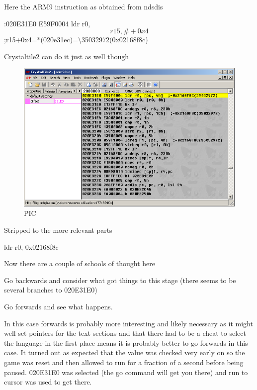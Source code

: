 \documentclass[
]{book}
\begin{document}
Here the ARM9 instruction as obtained from ndsdis

:020E31E0 E59F0004 ldr r0,\[r15, \#+0x4\] ;r15+0x4=*(020e31ec)=\textbackslash35032972(0x02168f8c)

Crystaltile2 can do it just as well though

\begin{figure}
\centering
\includegraphics{images/217_home_fast6191_romhackingguide_unrenamed_fil___iginal_borders_romhackguideasmlanguagemod_2.png}
\caption{PIC}
\end{figure}

Stripped to the more relevant parts

ldr r0, 0x02168f8c

Now there are a couple of schools of thought here

Go backwards and consider what got things to this stage (there seems to be several branches to 020E31E0)

Go forwards and see what happens.

In this case forwards is probably more interesting and likely necessary as it might well set pointers for the text sections and that there had to be a cheat to select the language in the first place means it is probably better to go forwards in this case. It turned out as expected that the value was checked very early on so the game was reset and then allowed to run for a fraction of a second before being paused. 020E31E0 was selected (the go command will get you there) and run to cursor was used to get there.
\end{document}
